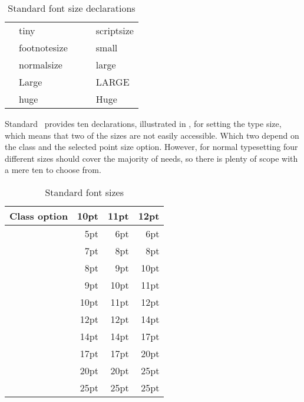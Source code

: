 \begin{table}
\centering
\caption{Standard font size declarations} \label{tab:fontsize}
\begin{tabular}{llcll} \toprule
\cmd{\tiny} & {\tiny tiny} & & \cmd{\scriptsize} & {\scriptsize scriptsize} \\[5pt]
\cmd{\footnotesize} & {\footnotesize footnotesize} & & \cmd{\small} & {\small small} \\[5pt]
\cmd{\normalsize} & {\normalsize normalsize} & & \cmd{\large} & {\large large} \\[5pt]
\cmd{\Large} & {\Large Large} & & \cmd{\LARGE} & {\LARGE LARGE} \\[5pt]
\cmd{\huge} & {\huge huge} & & \cmd{\Huge} & {\Huge Huge} \\[5pt]
\bottomrule
\end{tabular}
\end{table}

 Standard
\ltx\ provides ten
declarations, illustrated in , for setting the type size, 
which means that two of the sizes are
not easily accessible. Which two depend on the class and the 
selected point size option. However, for normal typesetting four different
sizes should cover the majority of needs, so there is plenty of scope with
a mere ten to choose from.

\begin{table}
\centering
\caption{Standard font sizes} \label{tab:standardclassfontsize}
\begin{tabular}{lrrr} \toprule
Class option        & 10pt & 11pt & 12pt \\ \midrule
\cmd{\tiny}         &  5pt &  6pt &  6pt \\
\cmd{\scriptsize}   &  7pt &  8pt &  8pt \\
\cmd{\footnotesize} &  8pt &  9pt & 10pt \\
\cmd{\small}        &  9pt & 10pt & 11pt \\
\cmd{\normalsize}   & 10pt & 11pt & 12pt \\ 
\cmd{\large}        & 12pt & 12pt & 14pt \\
\cmd{\Large}        & 14pt & 14pt & 17pt \\
\cmd{\LARGE}        & 17pt & 17pt & 20pt \\
\cmd{\huge}         & 20pt & 20pt & 25pt \\
\cmd{\Huge}         & 25pt & 25pt & 25pt \\ 
\bottomrule
\end{tabular}
\end{table}

